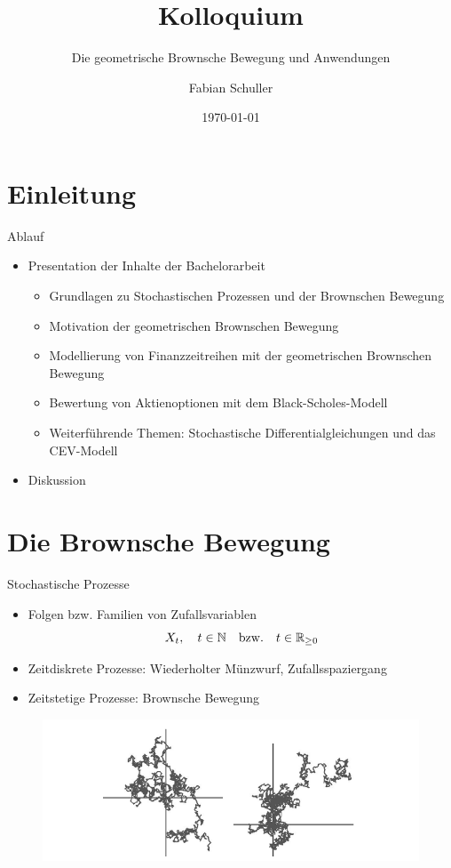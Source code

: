 \documentclass{beamer}
\title[Kolloquium]{Kolloquium}
\subtitle[Die geometrische Brownsche Bewegung und Anwendungen]{Die geometrische Brownsche Bewegung und Anwendungen}
\author{Fabian Schuller}
\date{\today}
\begin{document}
\section{Einleitung}

\begin{frame}
  \titlepage
\end{frame}

\begin{frame}{Ablauf}
  \begin{itemize}
    \item Presentation der Inhalte der Bachelorarbeit
    \begin{itemize}
      \item Grundlagen zu Stochastischen Prozessen und der Brownschen Bewegung
      \item Motivation der geometrischen Brownschen Bewegung
      \item Modellierung von Finanzzeitreihen mit der geometrischen Brownschen Bewegung
      \item Bewertung von Aktienoptionen mit dem Black-Scholes-Modell
      \item Weiterführende Themen: Stochastische Differentialgleichungen und das CEV-Modell
    \end{itemize}
    \item Diskussion
  \end{itemize}
\end{frame}

\section{Die Brownsche Bewegung}

\begin{frame}{Stochastische Prozesse}
    \begin{itemize}
      \item Folgen bzw. Familien von Zufallsvariablen $$X_t,\quad t \in \Bbb N \quad \mathrm{ bzw. } \quad  t \in \Bbb R_{\ge 0}$$
      \item Zeitdiskrete Prozesse: Wiederholter Münzwurf, Zufallsspaziergang
      \item Zeitstetige Prozesse: Brownsche Bewegung
    \end{itemize}
    \begin{figure}
      \centering
      \includegraphics[width=1\textwidth]{images/bb_2d.png}
    \end{figure}
\end{frame}
\end{document}
